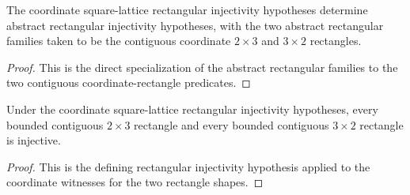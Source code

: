 \begin{lemma}%
    \label{lem:peps_squareLatticeRectangleInjectivity_toRectangular}
    \leanok
    The coordinate square-lattice rectangular injectivity hypotheses determine
    abstract rectangular injectivity hypotheses, with the two abstract
    rectangular families taken to be the contiguous coordinate $2\times 3$
    and $3\times 2$ rectangles.
\end{lemma}
\begin{proof}\leanok
    This is the direct specialization of the abstract rectangular families to
    the two contiguous coordinate-rectangle predicates.
\end{proof}

\begin{lemma}%
    \label{lem:peps_squareLatticeRectangleInjectivity_rectangles}
    \leanok
    Under the coordinate square-lattice rectangular injectivity hypotheses,
    every bounded contiguous $2\times3$ rectangle and every bounded
    contiguous $3\times2$ rectangle is injective.
\end{lemma}
\begin{proof}\leanok
    This is the defining rectangular injectivity hypothesis applied to the
    coordinate witnesses for the two rectangle shapes.
\end{proof}

